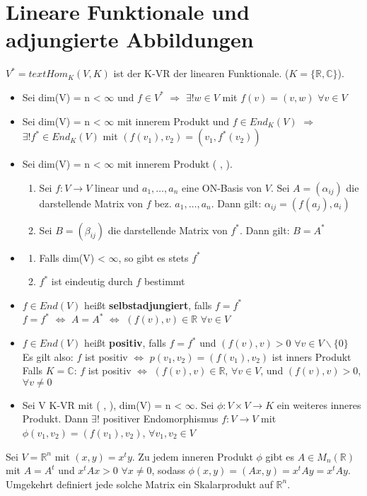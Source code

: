 \section{Lineare Funktionale und adjungierte Abbildungen}
$V^* = text{Hom}_K(V,K)$ ist der K-VR der linearen Funktionale. ($K = \{\mathbb{R}, \mathbb{C}\}$).
\begin{itemize}
\item Sei dim(V) = n < $\infty$ und $f \in V^*$ $\Rightarrow$ $\exists ! w \in V$ mit $f(v) = (v,w)$ $\forall v \in V$
\item Sei dim(V) = n < $\infty$ mit innerem Produkt und $ f \in End_K(V)$ $\Rightarrow$ $\exists ! f^* \in End_K(V)$ mit $(f(v_1), v_2) = (v_1, f^*(v_2))$
\item Sei dim(V) = n < $\infty$ mit innerem Produkt ( , ).
\begin{enumerate}
\item Sei $f: V \to V$ linear und $a_1, …, a_n$ eine ON-Basis von $V$. Sei $A = (\alpha_{ij})$ die darstellende Matrix von $f$ bez. $a_1, …, a_n$. Dann gilt: $\alpha_{ij} = (f(a_j), a_i)$
\item Sei $B = (\beta_{ij})$ die darstellende Matrix von $f^*$. Dann gilt: $B = A^*$
\end{enumerate}
\item
\begin{remark}
\begin{enumerate}
\item Falls dim(V) < $\infty$, so gibt es stets $f^*$
\item $f^*$ ist eindeutig durch $f$ bestimmt
\end{enumerate}
\end{remark}
\item $f \in End(V)$ heißt \textbf{selbstadjungiert}, falls $f = f^*$\\
$f = f^*$ $\Leftrightarrow$ $A = A^*$ $\Leftrightarrow$ $(f(v), v) \in \mathbb{R}$ $\forall v \in V$
\item $f \in End(V)$ heißt \textbf{positiv}, falls $f= f^*$ und $(f(v), v) > 0$ $\forall v \in V \backslash \{0\}$\\
Es gilt also: $f$ ist positiv $\Leftrightarrow$ $p(v_1, v_2) = (f(v_1), v_2)$ ist inners Produkt\\
Falls $K = \mathbb{C}$: $f$ ist positiv $\Leftrightarrow$ $(f(v), v) \in \mathbb{R}$, $\forall v \in V$, und $(f(v), v) > 0$, $\forall v \neq 0$
\item Sei V K-VR mit ( , ), dim(V) = n < $\infty$. Sei $\phi: V \times V \to K$ ein weiteres inneres Produkt. Dann $\exists !$ positiver Endomorphismus $f: V \to V$ mit $\phi(v_1, v_2) = (f(v_1), v_2)$, $\forall v_1, v_2 \in V$
\end{itemize}
\begin{remark}
Sei $V = \mathbb{R}^n$ mit $(x, y) = x^ty$. Zu jedem inneren Produkt $\phi$ gibt es $A \in M_n(\mathbb{R})$ mit $A = A^t$ und $x^tAx > 0$ $\forall x \neq 0$, sodass $\phi (x, y) = (Ax, y) = x^tAy = x^tAy$.\\
Umgekehrt definiert jede solche Matrix ein Skalarprodukt auf $\mathbb{R}^n$.
\end{remark}

